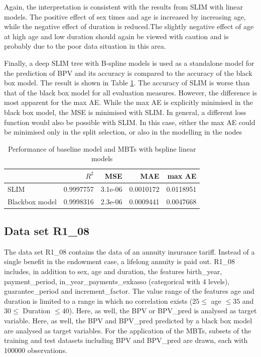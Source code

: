 Again, the interpretation is consistent with the results from SLIM with linear models. The positive effect of sex times and age is increased by increasing age, while the negative effect of duration is reduced.The slightly negative effect of age at high age and low duration should again be viewed with caution and is probably due to the poor data situation in this area.


Finally, a deep SLIM tree with B-spline models is used as a standalone model for the prediction of BPV and its accuracy is compared to the accuracy of the black box model. The result is shown in Table \ref{tab:ins_k2204_standalone_slim}.
The accuracy of SLIM is worse than that of the black box model for all evaluation measures. However, the difference is most apparent for the max AE. While the max AE is explicitly minimised in the black box model, the MSE is minimised with SLIM. In general, a different loss function would also be possible with SLIM. In this case, either the max AE could be minimised only in the split selection, or also in the modelling in the nodes

\begin{table}[!htb]

\caption{Performance of baseline model and MBTs with bspline linear models}
\centering \small
\begin{tabular}[t]{l|r|r|r|r}
\hline
  & $R^2$ & MSE & MAE & max AE \\
\hline
SLIM & 0.9997757 & 3.1e-06 & 0.0010172 & 0.0118951\\
Blackbox model & 0.9998316 & 2.3e-06 & 0.0009441 & 0.0047668\\
\hline
\end{tabular}
\label{tab:ins_k2204_standalone_slim}
\end{table}








\subsection{Data set R1\_08}

The data set R1\_08 contains the data of an annuity insurance tariff. Instead of a single benefit in the endowment case, a lifelong annuity is paid out.
R1\_08 includes, in addition to sex, age and duration, the features birth\_year, payment\_period, in\_year\_payments\_exkasso (categorical with 4 levels), guarantee\_period and increment\_factor.
The value range of the features age and duration is limited to a range in which no correlation exists ($25 \leq$ age $\leq 35$ and $30 \leq$ Duration $\leq 40$).
Here, as well, the BPV or BPV\_pred is analysed as target variable. Here, as well, the BPV and BPV\_pred predicted by a black box model are analysed as target variables.
For the application of the MBTs, subsets of the training and test datasets including BPV and BPV\_pred are drawn, each with 100000 observations.

